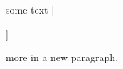 \documentclass{article}
\begin{document}
    some text  [ %

    ]%

    {more} in a new paragraph.
\end{document}
